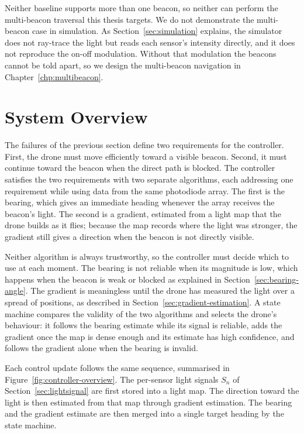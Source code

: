 Neither baseline supports more than one beacon, so neither can perform the multi-beacon traversal this thesis targets. We do not demonstrate the multi-beacon case in simulation. As Section~\ref{sec:simulation} explains, the simulator does not ray-trace the light but reads each sensor's intensity directly, and it does not reproduce the on-off modulation. Without that modulation the beacons cannot be told apart, so we design the multi-beacon navigation in Chapter~\ref{chp:multibeacon}.

\section{System Overview}
\label{sec:overview}

The failures of the previous section define two requirements for the controller. First, the drone must move efficiently toward a visible beacon. Second, it must continue toward the beacon when the direct path is blocked. The controller satisfies the two requirements with two separate algorithms, each addressing one requirement while using data from the same photodiode array. The first is the bearing, which gives an immediate heading whenever the array receives the beacon's light. The second is a gradient, estimated from a light map that the drone builds as it flies; because the map records where the light was stronger, the gradient still gives a direction when the beacon is not directly visible.

Neither algorithm is always trustworthy, so the controller must decide which to use at each moment. The bearing is not reliable when its magnitude is low, which happens when the beacon is weak or blocked as explained in Section~\ref{sec:bearing-angle}. The gradient is meaningless until the drone has measured the light over a spread of positions, as described in Section~\ref{sec:gradient-estimation}. A state machine compares the validity of the two algorithms and selects the drone's behaviour: it follows the bearing estimate while its signal is reliable, adds the gradient once the map is dense enough and its estimate has high confidence, and follows the gradient alone when the bearing is invalid.

Each control update follows the same sequence, summarised in Figure~\ref{fig:controller-overview}. The per-sensor light signals $S_n$ of Section~\ref{sec:lightsignal} are first stored into a light map. The direction toward the light is then estimated from that map through gradient estimation. The bearing and the gradient estimate are then merged into a single target heading by the state machine.

